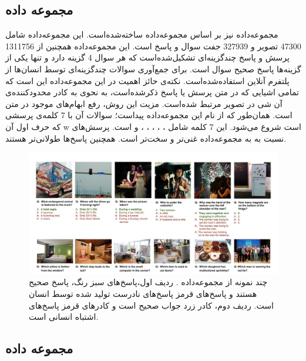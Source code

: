 \subsection[مجموعه داده \lr{Visual7w}]{مجموعه داده \cite{zhu2016visual7w}}
	مجموعه‌داده
	نیز بر اساس مجموعه‌داده
 \cite{lin2014microsoft}
	  ساخته‌شده‌است. این مجموعه‌داده شامل 47300 تصویر و 327939 جفت سوال و پاسخ است. این مجموعه‌داده همچنین از 1311756 پرسش و پاسخ چند‌گزینه‌ای تشکیل‌شده‌است که هر سوال 4 گزینه دارد و تنها یکی از گزینه‌ها پاسخ صحیح سوال است. برای جمع‌آوری سوالات چندگزینه‌ای توسط انسان‌ها از پلتفرم آنلاین 
  استفاده‌شده‌است. نکته‌ی حائز اهمیت در این ‌مجموعه‌داده این است که تمامی اشیایی که در متن پرسش یا پاسخ ذکر‌شده‌است، به نحوی به کادر محدود‌کننده‌ی آن شی در تصویر مرتبط شده‌است. مزیت این روش، رفع ابهام‌های موجود در متن است.  همان‌طور که از نام این مجموعه‌داده پیداست؛ سوالات آن با 7 کلمه‌ی پرسشی که حرف اول آن w است شروع می‌شود. این 7 کلمه شامل
  ،
  ،
  ،
  ،
  ،
  و
	است. پرسش‌های
	 نسبت به به مجموعه‌داده 
  غنی‌تر و سخت‌تر است. همچنین پاسخ‌ها طولانی‌تر هستند.
  \begin{figure}[h]
  	\centerline{\includegraphics[scale=0.5]{images/Visual7W.JPG}}
  	\caption[چند نمونه از مجموعه‌داده ]{چند نمونه از مجموعه‌داده
  		  \cite{zhu2016visual7w}. 
  		 ردیف اول،پاسخ‌های سبز رنگ، پاسخ صحیح هستند و پاسخ‌های قرمز پاسخ‌های نادرست تولید شده توسط انسان است. ردیف دوم، کادر زرد جواب صحیح است و کادرهای قرمز پاسخ‌های اشتباه انسانی است.}
  	\label{fig:Visual7WExample}
  \end{figure}
  
\subsection[مجموعه داده \lr{CLEVR}]{مجموعه داده \cite{johnson2017clevr}}

